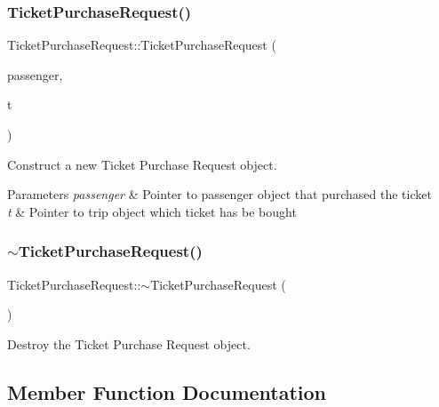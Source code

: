 \subsubsection{\texorpdfstring{Ticket\+Purchase\+Request()}{TicketPurchaseRequest()}}
{\footnotesize\ttfamily Ticket\+Purchase\+Request\+::\+Ticket\+Purchase\+Request (\begin{DoxyParamCaption}\item[{\mbox{\hyperlink{classPassenger}{Passenger}} $\ast$}]{passenger,  }\item[{\mbox{\hyperlink{classTrip}{Trip}} $\ast$}]{t }\end{DoxyParamCaption})}



Construct a new Ticket Purchase Request object. 


\begin{DoxyParams}{Parameters}
{\em passenger} & Pointer to passenger object that purchased the ticket \\
\hline
{\em t} & Pointer to trip object which ticket has be bought \\
\hline
\end{DoxyParams}
\mbox{\label{classTicketPurchaseRequest_afdd1e6ed2929ecb81dbefd1aecf22326}} 
\subsubsection{\texorpdfstring{$\sim$\+Ticket\+Purchase\+Request()}{~TicketPurchaseRequest()}}
{\footnotesize\ttfamily Ticket\+Purchase\+Request\+::$\sim$\+Ticket\+Purchase\+Request (\begin{DoxyParamCaption}{ }\end{DoxyParamCaption})}



Destroy the Ticket Purchase Request object. 



\subsection{Member Function Documentation}
\mbox{\label{classTicketPurchaseRequest_a24d2aab14853b8f7c8f5487145f3d26e}} 
